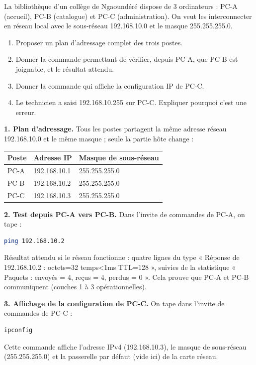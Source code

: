 \documentclass[11pt]{article}
\begin{document}
\begin{exoresolu}
La bibliothèque d'un collège de Ngaoundéré dispose de 3 ordinateurs : PC-A (accueil), PC-B (catalogue) et PC-C (administration). On veut les interconnecter en réseau local avec le sous-réseau 192.168.10.0 et le masque 255.255.255.0.
\begin{enumerate}
\item Proposer un plan d'adressage complet des trois postes.
\item Donner la commande permettant de vérifier, depuis PC-A, que PC-B est joignable, et le résultat attendu.
\item Donner la commande qui affiche la configuration IP de PC-C.
\item Le technicien a saisi 192.168.10.255 sur PC-C. Expliquer pourquoi c'est une erreur.
\end{enumerate}
\tcblower
\textbf{1. Plan d'adressage.} Tous les postes partagent la même adresse réseau 192.168.10.0 et le même masque ; seule la partie hôte change :
\begin{center}
\begin{tabularx}{\linewidth}{|l|X|X|}
\hline
\rowcolor{popblueL} \textbf{Poste} & \textbf{Adresse IP} & \textbf{Masque de sous-réseau} \\
\hline
PC-A & 192.168.10.1 & 255.255.255.0 \\
\hline
PC-B & 192.168.10.2 & 255.255.255.0 \\
\hline
PC-C & 192.168.10.3 & 255.255.255.0 \\
\hline
\end{tabularx}
\end{center}

\textbf{2. Test depuis PC-A vers PC-B.} Dans l'invite de commandes de PC-A, on tape :
\begin{lstlisting}[language=bash]
ping 192.168.10.2
\end{lstlisting}
Résultat attendu si le réseau fonctionne : quatre lignes du type « Réponse de 192.168.10.2 : octets=32 temps<1ms TTL=128 », suivies de la statistique « Paquets : envoyés = 4, reçus = 4, perdus = 0 ». Cela prouve que PC-A et PC-B communiquent (couches 1 à 3 opérationnelles).

\textbf{3. Affichage de la configuration de PC-C.} On tape dans l'invite de commandes de PC-C :
\begin{lstlisting}[language=bash]
ipconfig
\end{lstlisting}
Cette commande affiche l'adresse IPv4 (192.168.10.3), le masque de sous-réseau (255.255.255.0) et la passerelle par défaut (vide ici) de la carte réseau.


\end{exoresolu}
\end{document}
